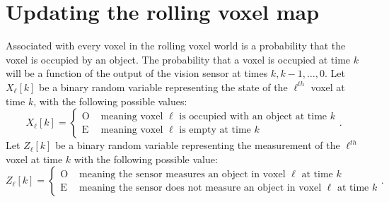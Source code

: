 \section{Updating the rolling voxel map}
\label{sec:voxel_map_updates}
Associated with every voxel in the rolling voxel world is a probability that the voxel is occupied by an object.  The probability that a voxel is occupied at time $k$ will be a function of the output of the vision sensor at times $k, k-1, \dots, 0$.  Let $X_\ell[k]$ be a binary random variable representing the state of the $\ell^{th}$ voxel at time $k$, with the following possible values:
\[
X_\ell[k] = \begin{cases}
	\text{O} & \text{~meaning voxel $\ell$ is occupied with an object at time $k$} \\
	\text{E} & \text{~meaning voxel $\ell$ is empty at time $k$}
\end{cases}. 
\]
Let $Z_{\ell}[k]$ be a binary random variable representing the measurement of the $\ell^{th}$ voxel at time $k$ with the following possible value:
\[
Z_\ell[k] = \begin{cases}
\text{O} & \text{~meaning the sensor measures an object in voxel $\ell$ at time $k$} \\
\text{E} & \text{~meaning the sensor does not measure an object in voxel $\ell$ at time $k$}
\end{cases}.
\]

